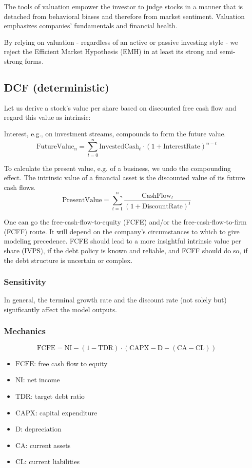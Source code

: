 The tools of valuation empower the investor to judge stocks in a manner that is detached from behavioral biases and therefore from market sentiment. Valuation emphasizes companies' fundamentals and financial health. 

By relying on valuation - regardless of an active or passive investing style - we reject the Efficient Market Hypothesis (EMH) in at least its strong and semi-strong forms.  

\subsection{DCF (deterministic)}

Let us derive a stock's value per share based on discounted free cash flow and regard this value as intrinsic: 

Interest, e.g., on investment streams, compounds to form the future value.
\[
\text{FutureValue}_n = \sum_{t=0}^{n} \text{InvestedCash}_t \cdot (1 + \text{InterestRate})^{n - t}
\]

To calculate the present value, e.g. of a business, we undo the compounding effect. The intrinsic value of a financial asset is the discounted value of its future cash flows. 
\[
\text{PresentValue} = \sum_{t=1}^{n} \frac{\text{CashFlow}_t}{(1 + \text{DiscountRate})^t}
\]

One can go the free-cash-flow-to-equity (FCFE) and/or the free-cash-flow-to-firm (FCFF) route. It will depend on the company's circumstances to which to give modeling precedence. FCFE should lead to a more insightful intrinsic value per share (IVPS), if the debt policy is known and reliable, and FCFF should do so, if the debt structure is uncertain or complex. 

\subsubsection{Sensitivity}

In general, the terminal growth rate and the discount rate (not solely but) significantly affect the model outputs. 

\subsubsection{Mechanics}

$$
\text{FCFE} = \text{NI} - (1 - \text{TDR}) \cdot (\text{CAPX} - \text{D} - (\text{CA} - \text{CL}))
$$

\begin{itemize}
  \item[] $\text{FCFE}$: free cash flow to equity
  \item[] $\text{NI}$: net income
  \item[] $\text{TDR}$: target debt ratio
  \item[] $\text{CAPX}$: capital expenditure
  \item[] $\text{D}$: depreciation
  \item[] $\text{CA}$: current assets
  \item[] $\text{CL}$: current liabilities
\end{itemize}

